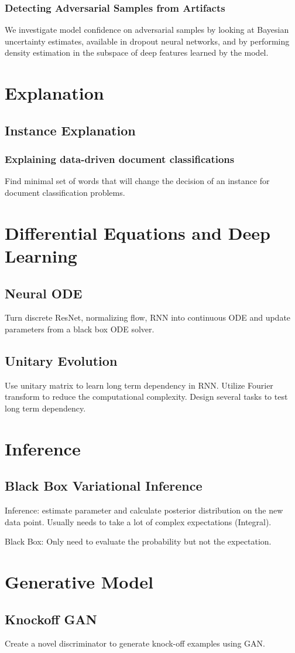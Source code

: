 \documentclass[10pt,a4paper]{article}
\begin{document}
\subsubsection{Detecting Adversarial Samples from Artifacts\cite{feinman2017detecting}}
We investigate model confidence on adversarial samples by looking at Bayesian uncertainty estimates, available in dropout neural networks, and by performing density estimation in the subspace of deep features learned by the model.
\section{Explanation}
\subsection{Instance Explanation}
\subsubsection{	
Explaining data-driven document classifications \cite{martens2013explaining}}
Find minimal set of words that will change the decision of an instance for document classification problems.
\section{Differential Equations and Deep Learning}
\subsection{Neural ODE \cite{chen2018neural}}
Turn discrete ResNet, normalizing flow, RNN into continuous ODE and update parameters from a black box ODE solver.
\subsection{Unitary Evolution \cite{arjovsky2016unitary}}
Use unitary matrix to learn long term dependency in RNN. Utilize Fourier transform to reduce the computational complexity. Design several tasks to test long term dependency.
\section{Inference}
\subsection{Black Box Variational Inference\cite{ranganath2014black}}
Inference: estimate parameter and calculate posterior distribution on the new data point. Usually needs to take a lot of complex expectations (Integral).

Black Box: Only need to evaluate the probability but not the expectation.
\section{Generative Model}
\subsection{Knockoff GAN}
Create a novel discriminator to generate knock-off examples using GAN.


\end{document}
